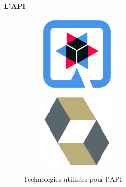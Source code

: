 \paragraph{L'API}

\begin{figure}
	\centering
	\begin{subfigure}{.45\textwidth}
		\centering
		\includegraphics[width=0.40\textwidth]{assets/quarkus.png}
		\label{fig:quarkus}
	\end{subfigure}
	\begin{subfigure}{.45\textwidth}
		\centering
		\includegraphics[width=0.40\textwidth]{assets/hibernate.png}
		\label{fig:openid}
	\end{subfigure}
	\caption{Technologies utilisées pour l'API}
\end{figure}

